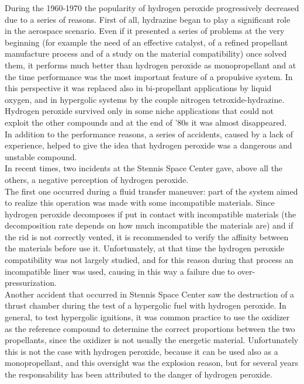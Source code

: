 \documentclass[a4paper]{report}
\begin{document}
During the 1960-1970 the popularity of hydrogen peroxide progressively decreased due to a series of reasons. First of all, hydrazine began to play a significant role in the aerospace scenario. Even if it presented a series of problems at the very beginning (for example the need of an effective catalyst, of a refined propellant manufacture process and of a study on the material compatibility) once solved them, it performs much better than hydrogen peroxide as monopropellant and at the time performance was the most important feature of a propulsive system. In this perspective it was replaced also in bi-propellant applications by liquid oxygen, and in hypergolic systems by the couple nitrogen tetroxide-hydrazine. Hydrogen peroxide survived only in some niche applications that could not exploit the other compounds and at the end of '80s it was almost disappeared. \\ 
In addition to the performance reasons, a series of accidents, caused by a lack of experience, helped to give the idea that hydrogen peroxide was a dangerous and unstable compound.\\
In recent times, two incidents at the Stennis Space Center gave, above all the others, a negative perception of hydrogen peroxide. \\
The first one occurred during a fluid transfer maneuver: part of the system aimed to realize this operation was made with some incompatible materials. Since hydrogen peroxide decomposes if put in contact with incompatible materials (the decomposition rate depends on how much incompatible the materials are) and if the rid is not correctly vented, it is recommended to verify the affinity between the materials before use it. Unfortunately, at that time the hydrogen peroxide compatibility was not largely studied, and for this reason during that process an incompatible liner was used, causing in this way a failure due to over-pressurization. \\
Another accident that occurred in Stennis Space Center saw the destruction of a thrust chamber during the test of a hypergolic fuel with hydrogen peroxide. In general, to test hypergolic ignitions, it was common practice to use the oxidizer as the reference compound to determine the correct proportions between the two propellants, since the oxidizer is not usually the energetic material. Unfortunately this is not the case with hydrogen peroxide, because it can be used also as a monopropellant, and this oversight was the explosion reason, but for several years the responsability has been attributed to the danger of hydrogen peroxide. \\
\end{document}
